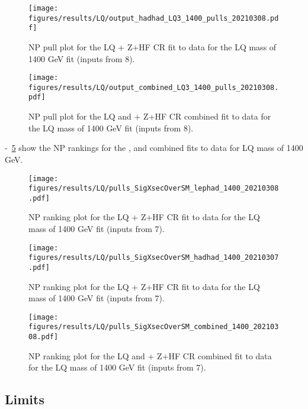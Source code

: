 \begin{figure}
\centering
\texttt{[image: figures/results/LQ/output\_hadhad\_LQ3\_1400\_pulls\_20210308.pdf]}
\caption{NP pull plot for the LQ \hadhad + Z+HF CR fit to data for the LQ mass of 1400 GeV fit (inputs from 8).}
\label{fig:LQ_HadHadPostfitNPPulls1400}
\end{figure}

\begin{figure}
\centering
\texttt{[image: figures/results/LQ/output\_combined\_LQ3\_1400\_pulls\_20210308.pdf]}
\caption{NP pull plot for the LQ \lephad and \hadhad + Z+HF CR combined fit to data for the LQ mass of 1400 GeV fit (inputs from 8).}
\label{fig:LQ_CombinedPostfitNPPulls1400}
\end{figure}

 -~\ref{fig:LQ_CombinedPostfitNPRankings1400} show the NP rankings for the \lephad, \hadhad and combined 
fits to data for LQ mass of 1400 GeV.

\begin{figure}
\centering
\texttt{[image: figures/results/LQ/pulls\_SigXsecOverSM\_lephad\_1400\_20210308.pdf]}
\caption{NP ranking plot for the LQ \lephad + Z+HF CR fit to data for the LQ mass of 1400 GeV fit (inputs from 7).}
\label{fig:LQ_LepHadPostfitNPRankings1400}
\end{figure}

\begin{figure}
\centering
\texttt{[image: figures/results/LQ/pulls\_SigXsecOverSM\_hadhad\_1400\_20210307.pdf]}
\caption{NP ranking plot for the LQ \hadhad + Z+HF CR fit to data for the LQ mass of 1400 GeV fit (inputs from 7).}
\label{fig:LQ_HadHadPostfitNPRankings1400}
\end{figure}

\begin{figure}
\centering
\texttt{[image: figures/results/LQ/pulls\_SigXsecOverSM\_combined\_1400\_20210308.pdf]}
\caption{NP ranking plot for the LQ \lephad and \hadhad + Z+HF CR combined fit to data for the LQ mass of 1400 GeV fit (inputs from 7).}
\label{fig:LQ_CombinedPostfitNPRankings1400}
\end{figure}


\subsection{Limits}
\label{subsec:LQ_limits}

